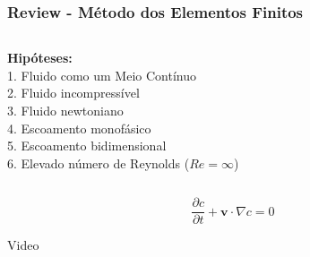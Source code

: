 \begin{frame} 
 \frametitle{\Large Review - Método dos Elementos Finitos}
\vspace{-1cm}
\begin{center}
\begin{columns}[c]
\begin{column}{0.8\textwidth} 
\hspace{1cm} \textbf{Hipóteses:}\\[0.1cm] 
\hspace{1cm}  1. Fluido como um Meio Contínuo\\[0.1cm]
\hspace{1cm}  2. Fluido incompressível\\[0.1cm]
\hspace{1cm}  3. Fluido newtoniano\\[0.1cm]
\hspace{1cm}  4. Escoamento monofásico\\[0.1cm]
\hspace{1cm}  5. Escoamento bidimensional\\[0.1cm]
\hspace{1cm}  6. Elevado número de Reynolds ($Re = \infty$)
\end{column}
\begin{column}{0.5\textwidth}
\end{column}
\end{columns}
\end{center}
\vspace{0.5cm}
\begin{equation*}
 \frac{\partial c}{\partial t} 
 + 
 \textbf{v} \cdot \nabla c
 = 0
\end{equation*}
\end{frame}



\begin{frame}
 \centering
 \vspace{-1cm}
 \Huge Video
\end{frame}

